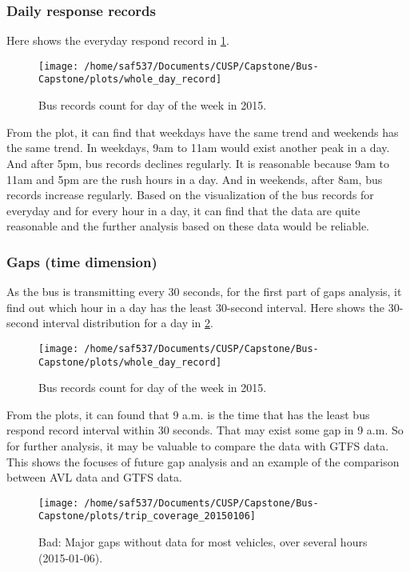 \documentclass[12pt]{report}
\begin{document}
      \subsubsection*{Daily response records}
      
       Here shows the everyday respond record in \ref{week}.

\begin{figure}[!ht]
	\label{week}
  \caption{Bus records count for day of the week in 2015.}
  \centering
    \texttt{[image: /home/saf537/Documents/CUSP/Capstone/Bus-Capstone/plots/whole\_day\_record]}
\end{figure}

   From the plot, it can find that weekdays have the same trend and weekends has the same trend. In weekdays, 9am to 11am would exist another peak in a day. And after 5pm, bus records declines regularly. It is reasonable because 9am to 11am and 5pm are the rush hours in a day. And in weekends, after 8am, bus records increase regularly.
      Based on the visualization of the bus records for everyday and for every hour in a day, it can find that the data are quite reasonable and the further analysis based on these data would be reliable. 
      
      \subsubsection*{Gaps (time dimension)}
      
        As the bus is transmitting every 30 seconds, for the first part of gaps analysis, it find out which hour in a day has the least 30-second interval. Here shows the 30-second interval distribution for a day in \ref{week_day}.

\begin{figure}[!ht]
\label{week_day}
  \caption{Bus records count for day of the week in 2015.}
  \centering
    \texttt{[image: /home/saf537/Documents/CUSP/Capstone/Bus-Capstone/plots/whole\_day\_record]}
\end{figure}


 From the plots, it can found that 9 a.m. is the time that has the least bus respond record  interval within 30 seconds. That may exist some gap in 9 a.m. So for further analysis, it may be valuable to compare the data with GTFS data. This shows the focuses of future gap analysis and an example of the comparison between AVL data and GTFS data.




\begin{figure}[!ht]
  \caption{Bad: Major gaps without data for most vehicles, over several hours (2015-01-06).}
  \centering
    \texttt{[image: /home/saf537/Documents/CUSP/Capstone/Bus-Capstone/plots/trip\_coverage\_20150106]}
\end{figure}
\end{document}
